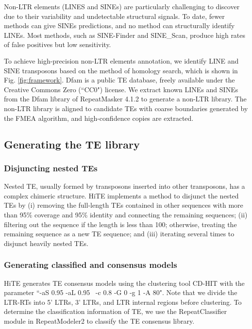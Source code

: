 \documentclass{bmcart}
\begin{document}
Non-LTR elements (LINES and SINEs) are particularly challenging to discover due to their variability and undetectable structural signals. To date, fewer methods can give SINEs predictions, and no method can structurally identify LINEs. Most methods, such as SINE-Finder\cite{wenke2011targeted} and SINE\_Scan\cite{mao2017sine_scan}, produce high rates of false positives but low sensitivity. 

To achieve high-precision non-LTR elements annotation, we identify LINE and SINE transposons based on the method of homology search, which is shown in Fig. \ref{fig:framework}. Dfam is a public TE database, freely available under the Creative Commons Zero (``CC0") license. We extract known LINEs and SINEs from the Dfam library of RepeatMasker 4.1.2 to generate a non-LTR library. The non-LTR library is aligned to candidate TEs with coarse boundaries generated by the FMEA algorithm, and high-confidence copies are extracted.

\subsection*{Generating the TE library}
\subsubsection*{Disjuncting nested TEs}
Nested TE, usually formed by transposons inserted into other transposons, has a complex chimeric structure. HiTE implements a method to disjunct the nested TEs by (i) removing the full-length TEs contained in other sequences with more than 95\% coverage and 95\% identity and connecting the remaining sequences; (ii) filtering out the sequence if the length is less than 100; otherwise, treating the remaining sequence as a new TE sequence; and (iii) iterating several times to disjunct heavily nested TEs.

\subsubsection*{Generating classified and consensus models}
HiTE generates TE consensus models using the clustering tool CD-HIT\cite{li2006cd} with the parameter ``-aS 0.95 -aL 0.95  -c 0.8 -G 0 -g 1 -A 80". Note that we divide the LTR-RTs into 5' LTRs, 3' LTRs, and LTR internal regions before clustering. To determine the classification information of TE, we use the RepeatClassifier module in RepeatModeler2\cite{flynn2020repeatmodeler2} to classify the TE consensus library.
\end{document}
